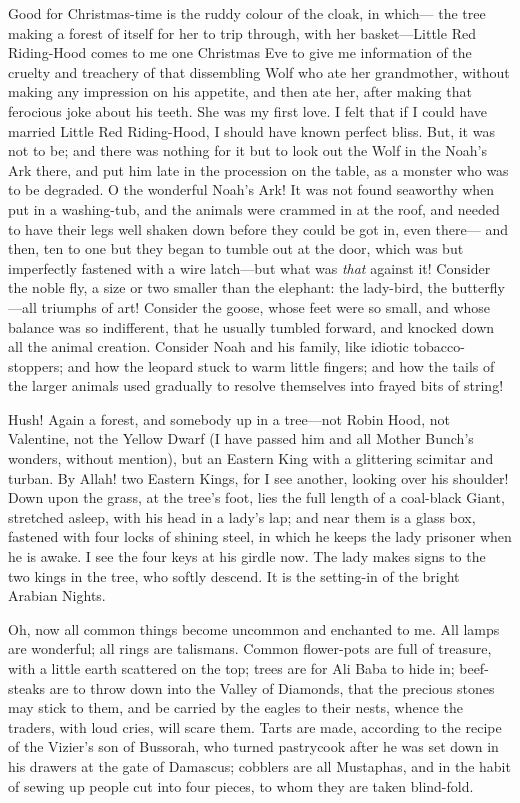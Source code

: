 Good for Christmas-time is the ruddy colour of the cloak, in which---%
the tree making a forest of itself for her to trip through, with her
basket---Little Red Riding-Hood comes to me one Christmas Eve to give
me information of the cruelty and treachery of that dissembling Wolf
who ate her grandmother, without making any impression on his
appetite, and then ate her, after making that ferocious joke about
his teeth.  She was my first love.  I felt that if I could have
married Little Red Riding-Hood, I should have known perfect bliss.
But, it was not to be; and there was nothing for it but to look out
the Wolf in the Noah's Ark there, and put him late in the procession
on the table, as a monster who was to be degraded.  O the wonderful
Noah's Ark!  It was not found seaworthy when put in a washing-tub,
and the animals were crammed in at the roof, and needed to have
their legs well shaken down before they could be got in, even there---%
and then, ten to one but they began to tumble out at the door,
which was but imperfectly fastened with a wire latch---but what was
\emph{that} against it!  Consider the noble fly, a size or two smaller than
the elephant:  the lady-bird, the butterfly---all triumphs of art!
Consider the goose, whose feet were so small, and whose balance was
so indifferent, that he usually tumbled forward, and knocked down
all the animal creation.  Consider Noah and his family, like idiotic
tobacco-stoppers; and how the leopard stuck to warm little fingers;
and how the tails of the larger animals used gradually to resolve
themselves into frayed bits of string!

Hush!  Again a forest, and somebody up in a tree---not Robin Hood,
not Valentine, not the Yellow Dwarf (I have passed him and all
Mother Bunch's wonders, without mention), but an Eastern King with a
glittering scimitar and turban.  By Allah! two Eastern Kings, for I
see another, looking over his shoulder!  Down upon the grass, at the
tree's foot, lies the full length of a coal-black Giant, stretched
asleep, with his head in a lady's lap; and near them is a glass box,
fastened with four locks of shining steel, in which he keeps the
lady prisoner when he is awake.  I see the four keys at his girdle
now.  The lady makes signs to the two kings in the tree, who softly
descend.  It is the setting-in of the bright Arabian Nights.

Oh, now all common things become uncommon and enchanted to me.  All
lamps are wonderful; all rings are talismans.  Common flower-pots
are full of treasure, with a little earth scattered on the top;
trees are for Ali Baba to hide in; beef-steaks are to throw down
into the Valley of Diamonds, that the precious stones may stick to
them, and be carried by the eagles to their nests, whence the
traders, with loud cries, will scare them.  Tarts are made,
according to the recipe of the Vizier's son of Bussorah, who turned
pastrycook after he was set down in his drawers at the gate of
Damascus; cobblers are all Mustaphas, and in the habit of sewing up
people cut into four pieces, to whom they are taken blind-fold.

